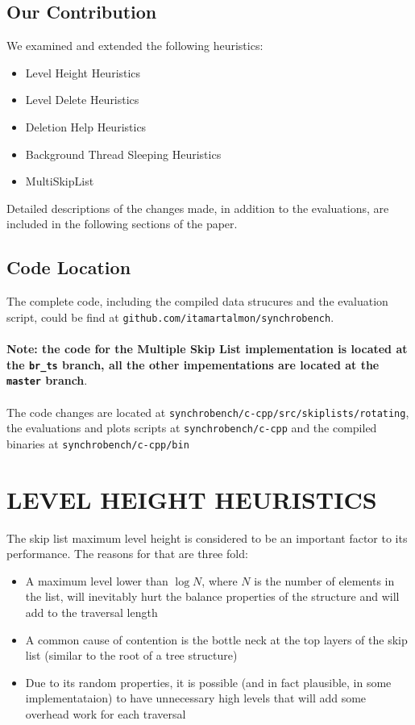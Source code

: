 \documentclass{article}
\begin{document}
\subsection{Our Contribution}
\label{ssec:oc}

We examined and extended the following heuristics:

\begin{itemize}
	\item Level Height Heuristics
	\item Level Delete Heuristics 
	\item Deletion Help Heuristics
	\item Background Thread Sleeping Heuristics
	\item MultiSkipList
\end{itemize}

\hfill \break
Detailed descriptions of the changes made, in addition to the evaluations, are included in the following sections of the paper.

\subsection{Code Location}
\label{ssec:cl}
The complete code, including the compiled data strucures and the evaluation script, could be find at \texttt{github.com/itamartalmon/synchrobench}.\\\\\textbf{Note: the code for the Multiple Skip List implementation is located at the \texttt{br\_ts} branch, all the other impementations are located at the \texttt{master} branch}.\\\\ The code changes are located at \texttt{synchrobench/c-cpp/src/skiplists/rotating}, the evaluations and plots scripts at  \texttt{synchrobench/c-cpp} and the compiled binaries at \texttt{synchrobench/c-cpp/bin}

\section{LEVEL HEIGHT HEURISTICS}
\label{sec:lhh}

The skip list maximum level height is considered to be an important factor to its performance. The reasons for that are three fold:

\begin{itemize}
	\item  A maximum level lower than $\log{N}$, where $N$ is the number of elements in the list, will inevitably hurt the balance properties of the structure and will add to the traversal length
	\item A common cause of contention is the bottle neck at the top layers of the skip list (similar to the root of a tree structure)
	\item Due to its random properties, it is possible (and in fact plausible, in some implementataion) to have unnecessary high levels that will add some overhead work for each traversal
\end{itemize}
\end{document}

